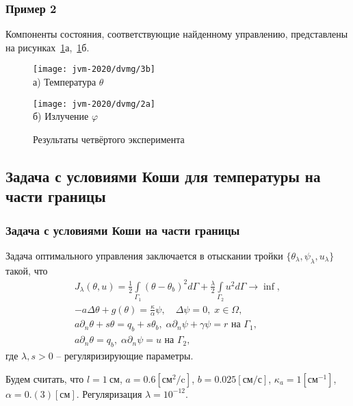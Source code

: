 \begin{frame}
    \frametitle{Пример 2}

    Компоненты состояния, соответствующие найденному управлению, представлены на
    рисунках~\ref{fig:4_4:4}а,~\ref{fig:4_4:4}б.


    \begin{figure}[h!t]
        \begin{minipage}[b][][b]{0.49\linewidth}
            \centering
            \texttt{[image: jvm-2020/dvmg/3b]}
            \\ а) Температура $\theta$
        \end{minipage}
        \hfill
        \begin{minipage}[b][][b]{0.49\linewidth}
            \centering
            \texttt{[image: jvm-2020/dvmg/2a]}
            \\ б) Излучение $\varphi$
        \end{minipage}
        \caption{Результаты четвёртого эксперимента}
        \label{fig:4_4:4}
    \end{figure}

\end{frame}

\subsection{Задача с условиями Коши для температуры на части границы}
\begin{frame}
    \frametitle{Задача с условиями Коши на части границы}

    Задача оптимального управления
    заключается в отыскании тройки $\{\theta_\lambda,\psi_\lambda,u_\lambda\}$ такой, что
    \begin{gather*}
        J_\lambda(\theta, u) =
        \frac{1}{2} \int \limits_{\Gamma_1} (\theta - \theta_b)^2 d \Gamma
        + \frac{\lambda}{2}\int\limits_{\Gamma_2} u^2 d\Gamma \rightarrow \inf, \\
        - a \Delta \theta + g (\theta) = \frac{\kappa}{\alpha}\psi, \quad
        \Delta \psi = 0, \; x \in \Omega, \\
        a \partial_n \theta + s \theta = q_b + s \theta_b,
        \; \alpha \partial_n \psi + \gamma \psi = r
        \text{ на } \Gamma_1,\\
        a \partial_n \theta = q_b, \;
        \alpha \partial_n \psi = u \text{ на } \Gamma_2,
    \end{gather*}
    где $\lambda, s > 0$ -- регуляризирующие параметры.

    Будем считать, что
    $l = 1~\text{см}$,
    $a = 0.6[\text{см}^2/\text{c}]$,
    $b = 0.025[\text{см}/\text{с}]$,
    $\kappa_a = 1[\text{см}^{-1}]$,
    $\alpha = 0.(3)[\text{см}]$.
    Регуляризация $\lambda=10^{-12}$.
\end{frame}


